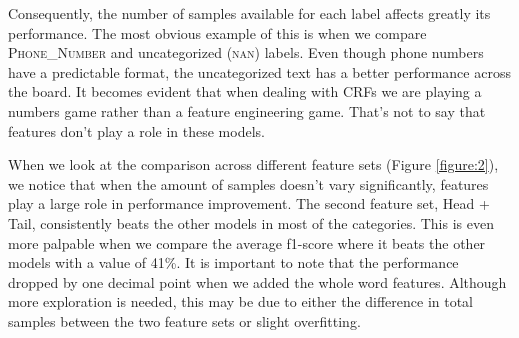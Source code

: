 \documentclass[a4paper, conference]{ieeeconf}
\begin{document}
  Consequently, the number of samples available for each label affects greatly
  its performance. The most obvious example of this is when we compare
  \textsc{Phone\_Number} and uncategorized (\textsc{nan}) labels. Even though
  phone numbers have a predictable format, the uncategorized text has a better
  performance across the board. It becomes evident that when dealing with CRFs
  we are playing a numbers game rather than a feature engineering game. That's
  not to say that features don't play a role in these models.

  When we look at the comparison across different feature sets (Figure
  \ref{figure:2}), we notice that when the amount of samples doesn't vary
  significantly, features play a large role in performance improvement. The
  second feature set, Head + Tail, consistently beats the other models in most
  of the categories. This is even more palpable when we compare the average
  f1-score where it beats the other models with a value of 41\%. It is
  important to note that the performance dropped by one decimal point when we
  added the whole word features. Although more exploration is needed, this may
  be due to either the difference in total samples between the two feature sets
  or slight overfitting.
\end{document}
